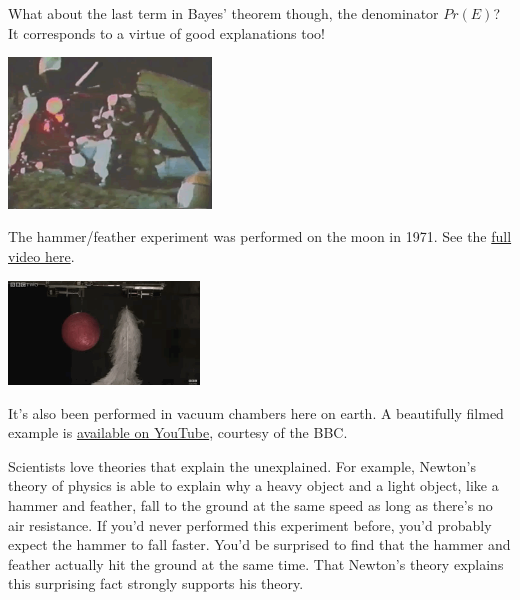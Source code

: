 \documentclass[justified]{tufte-book}
\newcommand{\p}{Pr}
\theoremstyle{definition}
\theoremstyle{definition}
\theoremstyle{definition}
\theoremstyle{remark}
\begin{document}
What about the last term in Bayes' theorem though, the denominator
\(\p(E)\)? It corresponds to a virtue of good explanations too!









\begin{marginfigure}
\includegraphics[width=2.12in]{img/moon} \caption[The hammer/feather experiment was performed on the moon
in 1971. See the \href{https://bit.ly/1KLQzOB}{full video here}.]{The hammer/feather experiment was performed on the moon
in 1971. See the \href{https://bit.ly/1KLQzOB}{full video here}.}\label{fig:unnamed-chunk-88}
\end{marginfigure}
\begin{marginfigure}
\includegraphics[width=2in]{img/vacuum} \caption[It's also been performed in vacuum chambers here on
earth. A beautifully filmed example is
\href{https://bit.ly/10hw8mP}{available on YouTube}, courtesy of the
BBC.]{It's also been performed in vacuum chambers here on
earth. A beautifully filmed example is
\href{https://bit.ly/10hw8mP}{available on YouTube}, courtesy of the
BBC.}\label{fig:unnamed-chunk-88}
\end{marginfigure}

Scientists love theories that explain the unexplained. For example,
Newton's theory of physics is able to explain why a heavy object and a
light object, like a hammer and feather, fall to the ground at the same
speed as long as there's no air resistance. If you'd never performed
this experiment before, you'd probably expect the hammer to fall faster.
You'd be surprised to find that the hammer and feather actually hit the
ground at the same time. That Newton's theory explains this surprising
fact strongly supports his theory.
\end{document}
